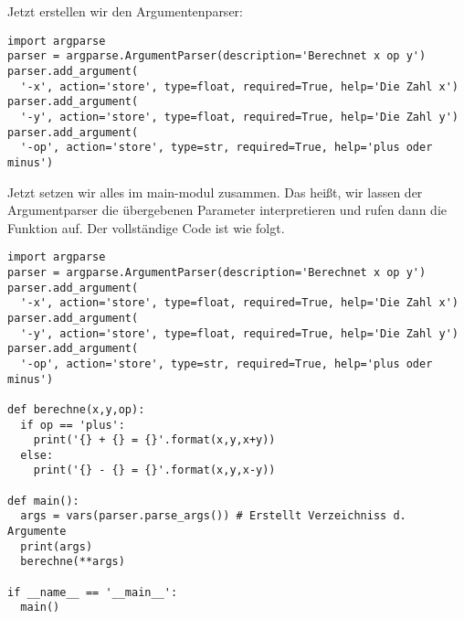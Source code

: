 Jetzt erstellen wir den Argumentenparser:
\begin{lstlisting}
import argparse
parser = argparse.ArgumentParser(description='Berechnet x op y')
parser.add_argument(
  '-x', action='store', type=float, required=True, help='Die Zahl x')
parser.add_argument(
  '-y', action='store', type=float, required=True, help='Die Zahl y')
parser.add_argument(
  '-op', action='store', type=str, required=True, help='plus oder minus')
\end{lstlisting}
Jetzt setzen wir alles im main-modul zusammen.
Das heißt, wir lassen der Argumentparser die übergebenen Parameter interpretieren und rufen dann die Funktion  auf.
Der vollständige Code ist wie folgt.
\begin{lstlisting}
import argparse
parser = argparse.ArgumentParser(description='Berechnet x op y')
parser.add_argument(
  '-x', action='store', type=float, required=True, help='Die Zahl x')
parser.add_argument(
  '-y', action='store', type=float, required=True, help='Die Zahl y')
parser.add_argument(
  '-op', action='store', type=str, required=True, help='plus oder minus')

def berechne(x,y,op):
  if op == 'plus':
    print('{} + {} = {}'.format(x,y,x+y))
  else:
    print('{} - {} = {}'.format(x,y,x-y))

def main():
  args = vars(parser.parse_args()) # Erstellt Verzeichniss d. Argumente
  print(args)
  berechne(**args)

if __name__ == '__main__':
  main()
\end{lstlisting}


